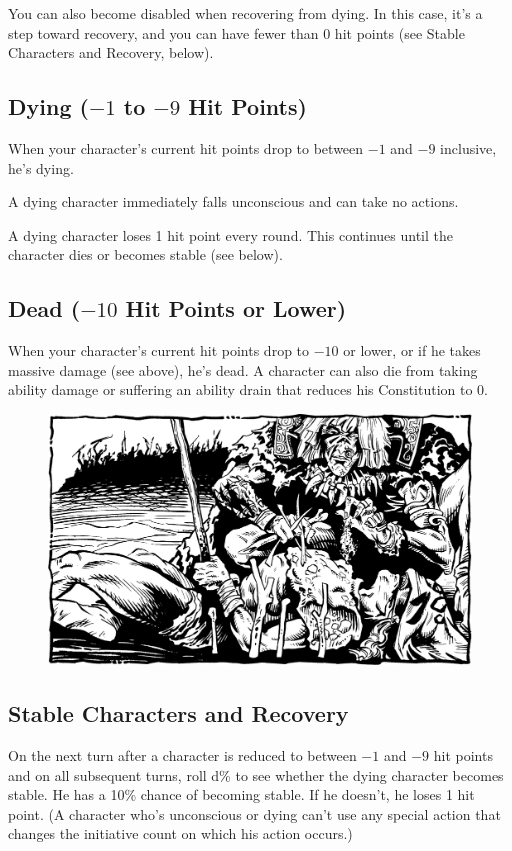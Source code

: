 You can also become disabled when recovering from dying. In this case, it's a step toward recovery, and you can have fewer than 0 hit points (see Stable Characters and Recovery, below).

\subsection{Dying ($-1$ to $-9$ Hit Points)}
When your character's current hit points drop to between $-1$ and $-9$ inclusive, he's dying.

A dying character immediately falls unconscious and can take no actions.

A dying character loses 1 hit point every round. This continues until the character dies or becomes stable (see below).

\subsection{Dead ($-10$ Hit Points or Lower)}
When your character's current hit points drop to $-10$ or lower, or if he takes massive damage (see above), he's dead. A character can also die from taking ability damage or suffering an ability drain that reduces his Constitution to 0.

\begin{figure}[b!]
\centering
\includegraphics[width=\textwidth]{images/heal-1.png}
\WOTC
\end{figure}
\subsection{Stable Characters and Recovery}
On the next turn after a character is reduced to between $-1$ and $-9$ hit points and on all subsequent turns, roll d\% to see whether the dying character becomes stable. He has a 10\% chance of becoming stable. If he doesn't, he loses 1 hit point. (A character who's unconscious or dying can't use any special action that changes the initiative count on which his action occurs.)

